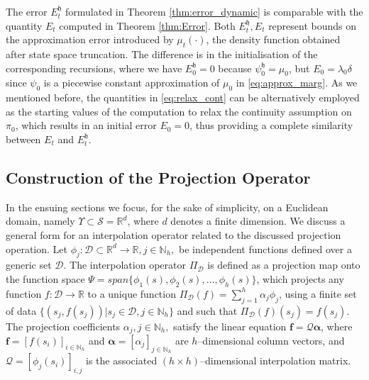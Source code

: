 \documentclass{LMCS}
\begin{document}
The error $E_t^{\mathfrak h}$ formulated in Theorem \ref{thm:error_dynamic} is comparable with the quantity $E_t$ computed in Theorem \ref{thm:Error}. 
Both $E_t^{\mathfrak h},E_t$ represent bounds on the approximation error introduced by $\mu_t(\cdot)$, 
the density function obtained after state space truncation. 
The difference is in the initialisation of the corresponding recursions, 
where we have $E_0^{\mathfrak h} = 0$ because $\psi_0^{\mathfrak h} = \mu_0$, 
but $E_0 = \lambda_0\delta$ since $\psi_0$ is a piecewise constant approximation of $\mu_0$ in \eqref{eq:approx_marg}. 
As we mentioned before, the quantities in \eqref{eq:relax_cont} can be alternatively employed as the starting values of the computation to relax the continuity assumption on $\pi_0$, which results in an initial error $E_0 = 0$, thus providing a complete similarity between $E_t$ and $E_t^{\mathfrak h}$.

\subsection{Construction of the Projection Operator}

In the ensuing sections we focus, for the sake of simplicity, on a Euclidean domain,   
namely $\Upsilon\subset \mathcal S=\mathbb{R}^d$, 
where $d$ denotes a finite dimension.
We discuss a general form for an interpolation operator related to the discussed projection operation. 
Let $\phi_j:\mathcal D\subset\mathbb R^d\rightarrow\mathbb R, j\in\mathbb N_h,$ be independent functions 
defined over a generic set $\mathcal D$. 
The interpolation operator $\Pi_{\mathcal D}$ is defined
as a projection map onto the function space $\Psi = span\{\phi_1(s),\phi_2(s),\ldots,\phi_h(s)\}$, 
which projects any function $f:\mathcal D\rightarrow \mathbb R$
to a unique function $\Pi_{\mathcal D}(f) = \sum_{j=1}^{h}\alpha_j\phi_j$,
using a finite set of data $\{(s_j,f(s_j))| s_j\in\mathcal D, j\in\mathbb N_h\}$ and 
such that $\Pi_{\mathcal D}(f)(s_j) = f(s_j)$.  
The projection coefficients $\alpha_j,j\in\mathbb N_h,$ satisfy the linear equation $\mathbf f = \mathcal Q \boldsymbol{\alpha}$,
where $\mathbf f = [f(s_i)]_{i \in\mathbb N_h}$ and $\boldsymbol{\alpha} = [\alpha_j]_{j \in\mathbb N_h}$ are $h$--dimensional column vectors, 
and $\mathcal Q = [\phi_j(s_i)]_{i,j}$ is the associated $(h\times h)$--dimensional interpolation matrix.

\medskip
\end{document}
